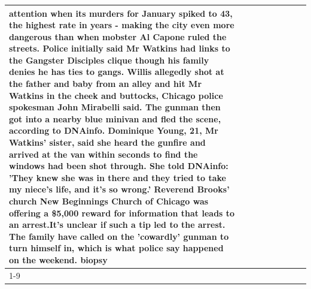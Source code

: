 \begin{table}[H]
\begin{tabular}{lllrlllll}
attention when its murders for January spiked to 43, the highest rate in years - making the city even more dangerous than when mobster Al Capone ruled the streets. Police initially said Mr Watkins had links to the Gangster Disciples clique though his family denies he has ties to gangs. Willis allegedly shot at the father and baby from an alley and hit Mr Watkins in the cheek and buttocks, Chicago police spokesman John Mirabelli said. The gunman then got into a nearby blue minivan and fled the scene, according to DNAinfo. Dominique Young, 21, Mr Watkins' sister, said she heard the gunfire and arrived at the van within seconds to find the windows had been shot through. She told DNAinfo: 'They knew she was in there and they tried to take my niece's life, and it's so wrong.' Reverend Brooks' church New Beginnings Church of Chicago was offering a \$5,000 reward for information that leads to an arrest.It's unclear if such a tip led to the arrest. The family have called on the 'cowardly' gunman to turn himself in, which is what police say happened on the weekend. biopsy \\
\cline{1-9}

\end{tabular}
\end{table}
